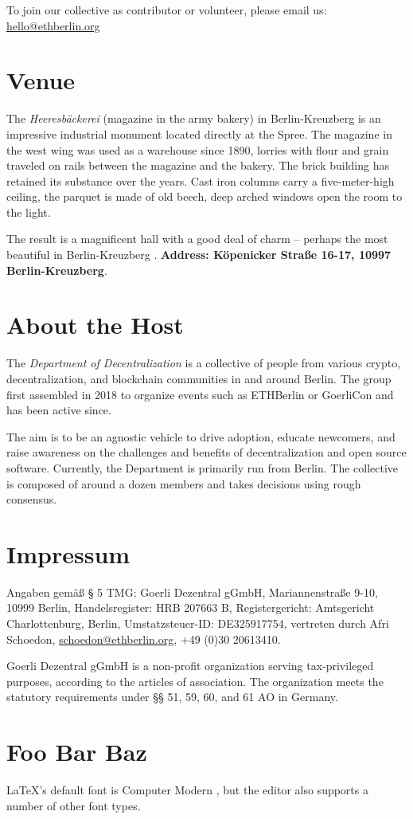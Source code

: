 \documentclass[a4paper,12pt]{article}
\begin{document}
  To join our collective as contributor or volunteer, please email us:\\
  \hspace*{3em}\url{hello@ethberlin.org}

  \section{Venue}
  The \textit{Heeresbäckerei} (magazine in the army bakery) \cite{backen} in Berlin-Kreuzberg is
  an impressive industrial monument located directly at the Spree. The magazine in the west wing
  was used as a warehouse since 1890, lorries with flour and grain traveled on rails between the
  magazine and the bakery. The brick building has retained its substance over the years. Cast iron
  columns carry a five-meter-high ceiling, the parquet is made of old beech, deep arched windows
  open the room to the light.

  The result is a magnificent hall with a good deal of charm – perhaps the most beautiful in
  Berlin-Kreuzberg \cite{xberg}. \textbf{Address: Köpenicker Straße 16-17, 10997 Berlin-Kreuzberg}.

  \section{About the Host}
  The \textit{Department of Decentralization} \cite{dod} is a collective of people from various
  crypto, decentralization, and blockchain communities in and around Berlin. The group first
  assembled in 2018 to organize events such as ETHBerlin \cite{ethberlin} or GoerliCon
  \cite{goerli} and has been active since.

  The aim is to be an agnostic vehicle to drive adoption, educate newcomers, and raise awareness
  on the challenges and benefits of decentralization and open source software. Currently, the
  Department is primarily run from Berlin. The collective is composed of around a dozen members
  and takes decisions using rough consensus.

  \section{Impressum}
  Angaben gemäß § 5 TMG: Goerli Dezentral gGmbH, Mariannenstraße 9-10, 10999 Berlin,
  Handelsregister: HRB 207663 B, Registergericht: Amtsgericht Charlottenburg, Berlin,
  Umstatzsteuer-ID: DE325917754, vertreten durch Afri Schoedon, \url{schoedon@ethberlin.org},
  +49 (0)30 20613410.

  Goerli Dezentral gGmbH is a non-profit organization serving tax-privileged
  purposes, according to the articles of association. The organization meets the statutory
  requirements under §§ 51, 59, 60, and 61 AO in Germany.

  \section{Foo Bar Baz}
  \LaTeX's default font is Computer Modern \cite{font}, but the editor also supports a
  number of other font types.

  \printbibliography
\end{document}
